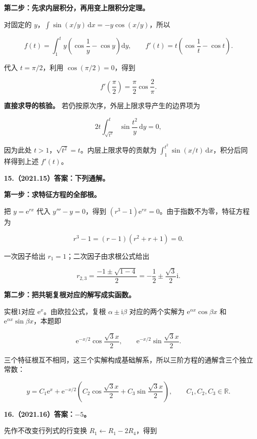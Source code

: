 \documentclass[UTF8,11pt,fontset=windows]{ctexart}
\begin{document}
\textbf{第二步：先求内层积分，再用变上限积分定理。}

对固定的 $y$，$\int\sin(x/y)\,\mathrm dx=-y\cos(x/y)$，所以

$$
f(t)=\int_1^t y\left(\cos\frac1y-\cos y\right)\mathrm dy,
\qquad
f'(t)=t\left(\cos\frac1t-\cos t\right).
$$

代入 $t=\pi/2$，利用 $\cos(\pi/2)=0$，得到

$$
\boxed{f'\left(\frac\pi2\right)=\frac\pi2\cos\frac2\pi}.
$$

\textbf{直接求导的核验。} 若仍按原次序，外层上限求导产生的边界项为

$$
2t\int_{\sqrt{t^2}}^t\sin\frac{t^2}{y}\,\mathrm dy=0,
$$

因为此处 $t>1$，$\sqrt{t^2}=t$。内层上限求导的贡献为 $\int_1^{t^2}\sin(x/t)\,\mathrm dx$，积分后同样得到上述 $f'(t)$。

\clearpage

\textbf{15.（2021.15）答案：下列通解。}

\textbf{第一步：求特征方程的全部根。}

把 $y=\mathrm e^{rx}$ 代入 $y'''-y=0$，得到 $(r^3-1)\mathrm e^{rx}=0$。由于指数不为零，特征方程为

$$
r^3-1=(r-1)(r^2+r+1)=0.
$$

一次因子给出 $r_1=1$；二次因子由求根公式给出

$$
r_{2,3}=\frac{-1\pm\sqrt{1-4}}2
=-\frac12\pm\frac{\sqrt3}{2}\mathrm i.
$$

\textbf{第二步：把共轭复根对应的解写成实函数。}

实根1对应 $\mathrm e^x$。由欧拉公式，复根 $\alpha\pm\mathrm i\beta$ 对应的两个实解为 $\mathrm e^{\alpha x}\cos\beta x$ 和 $\mathrm e^{\alpha x}\sin\beta x$，本题即

$$
\mathrm e^{-x/2}\cos\frac{\sqrt3x}{2},
\qquad \mathrm e^{-x/2}\sin\frac{\sqrt3x}{2}.
$$

三个特征根互不相同，这三个实解构成基础解系，所以三阶方程的通解含三个独立常数：

$$
\boxed{y=C_1\mathrm e^x+\mathrm e^{-x/2}
\left(C_2\cos\frac{\sqrt3x}{2}+C_3\sin\frac{\sqrt3x}{2}\right)},
\qquad C_1,C_2,C_3\in\mathbb R.
$$

\clearpage

\textbf{16.（2021.16）答案：$-5$。}

先作不改变行列式的行变换 $R_1\leftarrow R_1-2R_4$，得到
\end{document}
